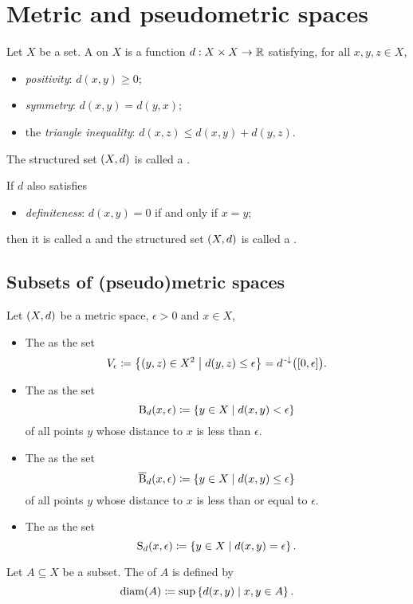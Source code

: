 \section{Metric and pseudometric spaces}
\begin{definition}
Let $X$ be a set. A  on $X$ is a function $d: X\times X\to \mathbb{R}$ satisfying, for all $x,y,z\in X$,
\begin{itemize}
\item \emph{positivity}: $d(x,y) \geq 0$;
\item \emph{symmetry}: $d(x,y) = d(y,x)$;
\item the \emph{triangle inequality}: $d(x,z) \leq d(x,y) + d(y,z)$.
\end{itemize}
The structured set $\left( X,d \right)$ is called a .

If $d$ also satisfies
\begin{itemize}
\item \emph{definiteness}: $d(x,y) = 0$ \textup{if and only if} $x=y$;
\end{itemize}
then it is called a  and the structured set $\left( X,d \right)$ is called a .
\end{definition}

\subsection{Subsets of (pseudo)metric spaces}
\begin{definition}
Let $\left( X,d \right)$ be a metric space, $\epsilon >0$ and $x\in X$,
\begin{itemize}
\item The  as the set
\[ V_\epsilon \defeq \setbuilder{(y,z)\in X^2}{d(y,z)\leq \epsilon} = d^{\preimf}\big(\interval{0,\epsilon}\big). \]
\item The  as the set
\[ \operatorname{B}_d(x,\epsilon) \coloneqq \left\{ y\in X \;\middle|\; d(x,y)< \epsilon \right\} \]
of all points $y$ whose distance to $x$ is less than $\epsilon$.
\item The  as the set
\[ \operatorname{\overline{B}}_d(x,\epsilon) \coloneqq \left\{ y\in X \;\middle|\; d(x,y)\leq \epsilon \right\} \]
of all points $y$ whose distance to $x$ is less than or equal to $\epsilon$.
\item The  as the set
\[ \operatorname{S}_d(x,\epsilon) \coloneqq \left\{ y\in X \;\middle|\; d(x,y) = \epsilon \right\}. \]
\end{itemize}
Let $A\subseteq X$ be a subset. The  of $A$ is defined by
\[ \operatorname{diam}(A) \coloneqq \sup \left\{ d(x,y) \;\middle|\; x,y\in A \right\}. \]
\end{definition}

